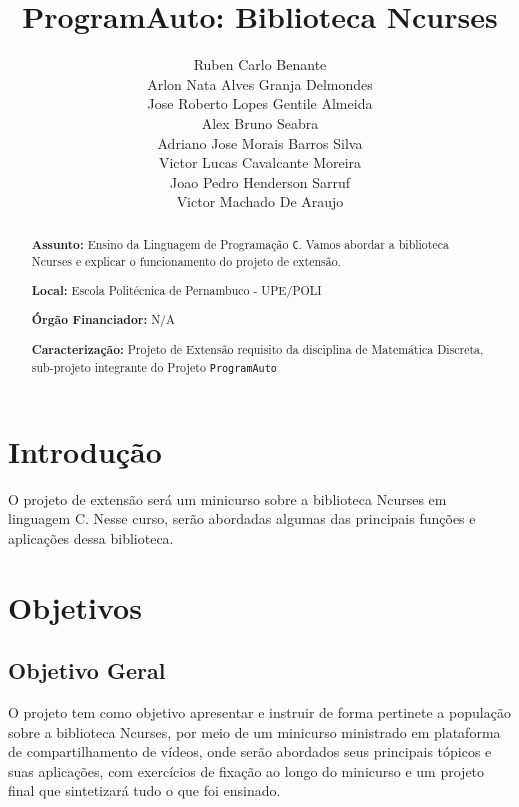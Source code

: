 \documentclass[a4paper,10pt]{article} %
\title{ProgramAuto: Biblioteca Ncurses}
\author{Ruben Carlo Benante \\ Arlon Nata Alves Granja Delmondes \\ Jose Roberto Lopes Gentile Almeida \\ Alex Bruno Seabra \\ Adriano Jose Morais Barros Silva \\ Victor Lucas Cavalcante Moreira \\ Joao Pedro Henderson Sarruf \\ Victor Machado De Araujo}
\begin{document}
\maketitle

\begin{abstract}

\textbf{Assunto:} Ensino da Linguagem de Programação \texttt{C}.
Vamos abordar a biblioteca Ncurses e explicar o funcionamento do projeto de extensão.



\textbf{Local:} Escola Politécnica de Pernambuco - UPE/POLI

\textbf{Órgão Financiador:} N/A

\textbf{Caracterização:} Projeto de Extensão requisito da disciplina de Matemática Discreta, sub-projeto integrante do Projeto \texttt{ProgramAuto}


\end{abstract}


\section{Introdução}

O projeto de extensão será um minicurso sobre a biblioteca Ncurses em linguagem C. Nesse curso, serão abordadas algumas das principais funções e aplicações dessa biblioteca.

\section{Objetivos}

\subsection{Objetivo Geral}
O projeto tem como objetivo apresentar e instruir de forma pertinete a população sobre a biblioteca Ncurses, por meio de um minicurso ministrado em plataforma de compartilhamento de vídeos, onde serão abordados seus principais tópicos e suas aplicações, com exercícios de fixação ao longo do minicurso e um projeto final que sintetizará tudo o que foi ensinado.
\end{document}
